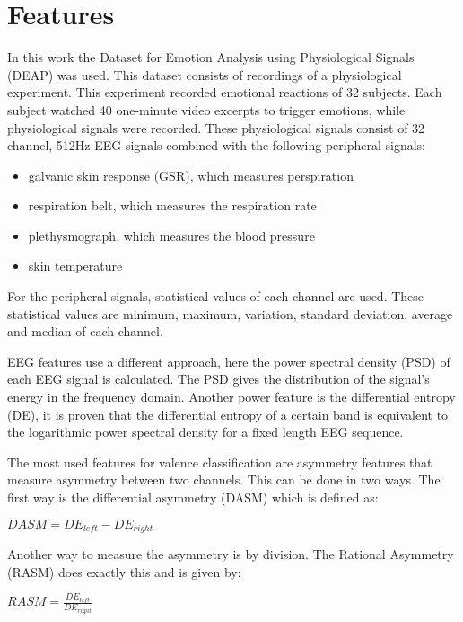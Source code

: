 \documentclass[12pt,journal,compsoc]{IEEEtran}
\newcommand{\npar}{\par \vspace{2.3ex plus 0.3ex minus 0.3ex}}
\begin{document}
\section{Features} \label{features}
\npar
In this work the Dataset for Emotion Analysis using Physiological Signals (DEAP) was used. This dataset consists of recordings of a physiological experiment\citep{DEAP}. This experiment recorded emotional reactions of 32 subjects. Each subject watched 40 one-minute video excerpts to trigger emotions, while physiological signals were recorded. These physiological signals consist of 32 channel, 512Hz EEG signals combined with the following peripheral signals:
\begin{itemize}
\item galvanic skin response (GSR), which measures perspiration
\item respiration belt, which measures the respiration rate
\item plethysmograph, which measures the blood pressure
\item skin temperature
\end{itemize}
For the peripheral signals, statistical values of each channel are used. These statistical values are minimum, maximum, variation, standard deviation, average and median of each channel. 

\npar

EEG features use a different approach, here the power spectral density (PSD) of each EEG signal is calculated. The PSD gives the distribution of the signal's energy in the frequency domain. Another power feature is the differential entropy (DE), it is proven that the differential entropy of a certain band is equivalent to the logarithmic power spectral density for a fixed length EEG sequence\citep{killyPaper}.

\npar

The most used features for valence classification are asymmetry features that measure asymmetry between two channels\cite{GivenPaper}. This can be done in two ways. The first way is the differential asymmetry (DASM) which is defined as:

\begin{center}
$DASM = DE_{left} - DE_{right}$
\end{center}

Another way to measure the asymmetry is by division. The Rational Asymmetry (RASM) does exactly this and is given by:

\begin{center}
$RASM = \frac{DE_{left}}{DE_{right}}$
\end{center}
\end{document}
